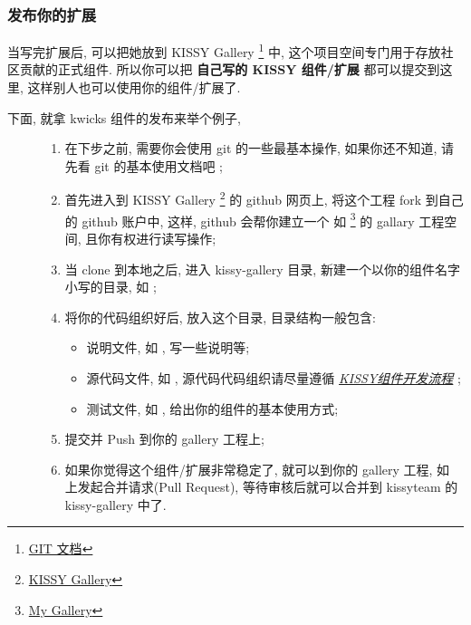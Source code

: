 \documentclass[letterpaper,10pt,english]{sphinxmanual}
\begin{document}
\subsubsection{发布你的扩展}
\label{quickstart/extendwidgets:id3}
当写完扩展后, 可以把她放到 KISSY Gallery \footnote{
\href{http://www.slideshare.net/chacon/getting-git}{GIT 文档}
} 中, 这个项目空间专门用于存放社区贡献的正式组件.
所以你可以把 \textbf{自己写的 KISSY 组件/扩展} 都可以提交到这里, 这样别人也可以使用你的组件/扩展了.
\begin{description}
\item[{下面, 就拿  kwicks 组件的发布来举个例子,}] \leavevmode\begin{enumerate}
\item {}
在下步之前, 需要你会使用 git 的一些最基本操作, 如果你还不知道, 请先看 git 的基本使用文档吧 \footnotemark[2] ;

\item {}
首先进入到 KISSY Gallery \footnote{
\href{http://github.com/kissyteam/kissy-gallery}{KISSY Gallery}
} 的 github 网页上, 将这个工程 fork 到自己的 github 账户中, 这样, github 会帮你建立一个 如 \footnote{
\href{http://github.com/lizzie/kissy-gallery}{My Gallery}
} 的 gallary 工程空间, 且你有权进行读写操作;

\item {}
当 clone 到本地之后, 进入 kissy-gallery 目录, 新建一个以你的组件名字小写的目录, 如 ;

\item {}
将你的代码组织好后, 放入这个目录, 目录结构一般包含:
\begin{itemize}
\item {}
说明文件, 如 , 写一些说明等;

\item {}
源代码文件, 如 , 源代码代码组织请尽量遵循 {\hyperref[workflow/index:workflow]{\emph{KISSY组件开发流程}}} ;

\item {}
测试文件, 如 , 给出你的组件的基本使用方式;

\end{itemize}

\item {}
提交并 Push 到你的 gallery 工程上;

\item {}
如果你觉得这个组件/扩展非常稳定了, 就可以到你的 gallery 工程, 如 \footnotemark[4] 上发起合并请求(Pull Request), 等待审核后就可以合并到 kissyteam 的 kissy-gallery 中了.

\end{enumerate}

\end{description}
\end{document}

